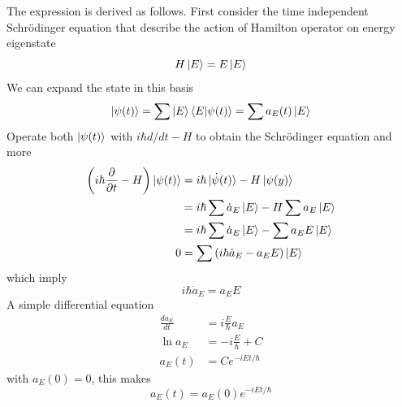 \documentclass[../../../main.tex]{subfiles}
\begin{document}
The expression is derived as follows.
First consider the time independent Schrödinger equation that describe the action of Hamilton operator on energy eigenstate
\begin{equation*}
    H \ket{E}=E \ket{E}
\end{equation*}
We can expand the state in this basis
\begin{equation*}
    \ket{\psi(t)}=\sum \ket{E }\braket{E|\psi(t)}=\sum a_E(t)\ket{E}
\end{equation*}
Operate both $\ket{\psi(t)}$ with $i \hbar d/dt-H$ to obtain the Schrödinger equation and more
\begin{align*}
    \left( i \hbar \frac{\partial }{\partial t }-H  \right) \ket{\psi(t)} & = i \hbar \ket{\dot{\psi}(t)}-H \ket{\psi(y)}          \\
                                                                          & = i \hbar \sum \dot{a}_E \ket{E }- H\sum a_E \ket{E }  \\
                                                                          & = i \hbar \sum \dot{a}_E \ket{E }- \sum a_E E\ket{E }  \\
    0                                                                     & = \sum \left( i \hbar \dot{a }_E-a_EE  \right) \ket{E}
\end{align*}
which imply
\begin{equation*}
    i \hbar \dot{a }_E=a_EE
\end{equation*}
A simple differential equation
\begin{align*}
    \frac{d a_E }{dt } & = i \frac{E }{\hbar }a_E \\
    \ln a_E            & = -i \frac{E }{\hbar }+C \\
    a_E(t)             & = C e^{-i E t/\hbar}
\end{align*}
with $a_E(0)=0$, this makes
\begin{equation*}
    a_E(t)= a_E(0)e^{-i E t/\hbar}
\end{equation*}
\end{document}
